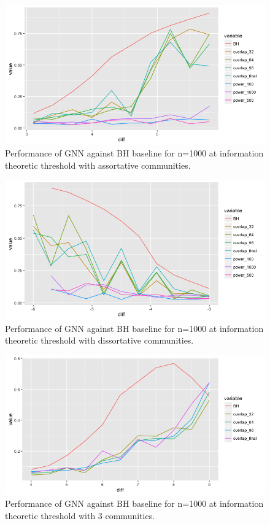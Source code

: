 \begin{figure}[H]
\begin{center}
  \includegraphics[scale=0.55]{asso.png}
  \caption{Performance of GNN against BH baseline for n=1000 at information theoretic threshold with assortative communities.}
  \label{fig:ass}
\end{center}
\end{figure}

\begin{figure}[H]
\begin{center}
  \includegraphics[scale=0.55]{diss.png}
  \caption{Performance of GNN against BH baseline for n=1000 at information theoretic threshold with dissortative communities.}
  \label{fig:diss}
\end{center}
\end{figure}

\begin{figure}[H]
\begin{center}
  \includegraphics[scale=0.55]{k3.png}
  \caption{Performance of GNN against BH baseline for n=1000 at information theoretic threshold with 3 communities.}
  \label{fig:k3}
\end{center}
\end{figure}



